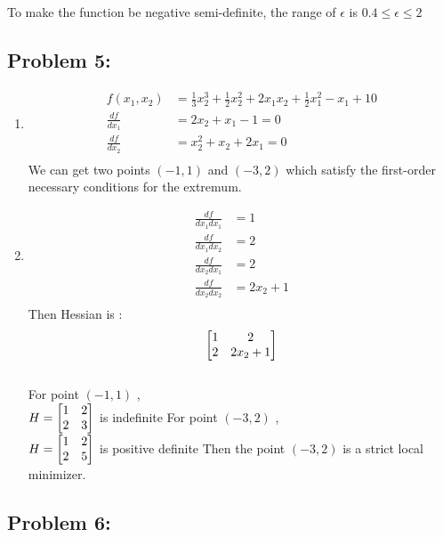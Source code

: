 \documentclass{article}
\begin{document}
To make the function be negative semi-definite, the range of $\epsilon$ is $ 0.4 \leq \epsilon \leq 2 $ 

\subsection*{Problem 5: } 
\begin{enumerate} 
\item
\begin{align*}
f(x_1, x_2) & = \frac{1}{3}x_2^3 + \frac{1}{2}x_2^2 + 2x_1x_2 + \frac{1}{2}x_1^2-x_1+10 \\
\frac{df}{dx_1} &= 2x_2 + x_1 -1 = 0 \\
\frac{df}{dx_2} &= x_2^2 +x_2 + 2x_1 = 0 \\
\end{align*} 
We can get two points $(-1, 1)$ and $(-3, 2)$ which satisfy the first-order necessary conditions for the extremum. \\
\item 
\begin{align*} 
\frac{df}{dx_1dx_1} &= 1 \\
\frac{df}{dx_1dx_2} &=  2 \\
\frac{df}{dx_2dx_1} &= 2 \\
\frac{df}{dx_2dx_2} &= 2x_2 + 1 \\
\end{align*}
Then Hessian is : \begin{align*} \begin{bmatrix} 1 & 2 \\ 2 & 2x_2 + 1 \end{bmatrix} \end{align*} \\
For point $(-1, 1)$ , \\
$H = \begin{bmatrix} 1 & 2 \\ 2 & 3 \end{bmatrix} $  is indefinite
For point $(-3, 2) $ , \\
$H = \begin{bmatrix} 1 & 2 \\ 2 & 5 \end{bmatrix} $ is positive definite
Then the point $(-3, 2)$ is a strict local minimizer. 

\end{enumerate} 

\subsection*{Problem 6: } 
\end{document}
